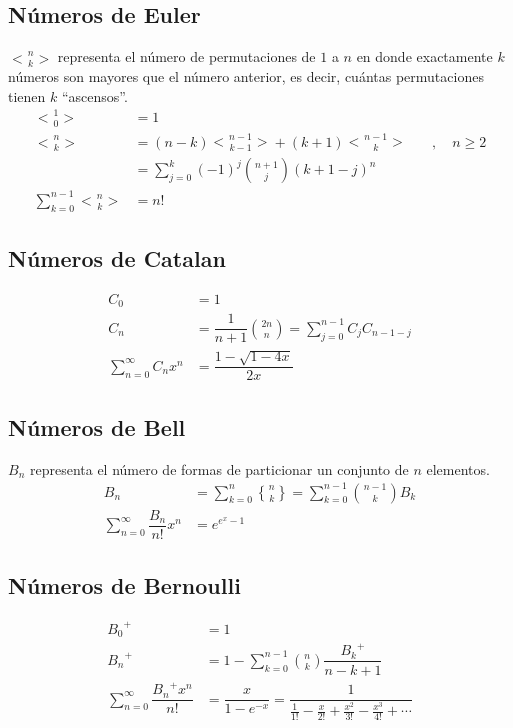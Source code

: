\documentclass[11pt]{article}
\newcommand{\genstirlingII}[3]{%
	\genfrac{\{}{\}}{0pt}{#1}{#2}{#3}%
}
\newcommand{\genEuler}[3]{%
	\genfrac{<}{>}{0pt}{#1}{#2}{#3}%
}
\newcommand{\stirlingII}[2]{\genstirlingII{}{#1}{#2}}
\newcommand{\euler}[2]{\genEuler{}{#1}{#2}}
\begin{document}
		\subsection{Números de Euler}
			$\euler{n}{k}$ representa el número de permutaciones de $1$ a $n$ en donde exactamente $k$ números son mayores que el número anterior, es decir, cuántas permutaciones tienen $k$ ``ascensos''.
			\begin{align*}
				\euler{1}{0} &= 1 \\
				\euler{n}{k} &= (n-k)\euler{n-1}{k-1} + (k+1)\euler{n-1}{k} \quad &, \quad n \geq 2 \\
				&= \sum_{j=0}^{k} (-1)^j \binom{n+1}{j} (k+1-j)^n \\
				\sum_{k=0}^{n-1} \euler{n}{k} &= n!
			\end{align*}
		
		\subsection{Números de Catalan}
			\begin{align*}
				C_0 &= 1 \\
				C_n &= \dfrac{1}{n+1}\binom{2n}{n} = \sum_{j=0}^{n-1} C_j C_{n-1-j} \\
				\sum_{n=0}^{\infty} C_n x^n &= \dfrac{1-\sqrt{1-4x}}{2x}
			\end{align*}
		
		\subsection{Números de Bell}
			$B_n$ representa el número de formas de particionar un conjunto de $n$ elementos.
			\begin{align*}
				B_n &= \sum_{k=0}^{n}\stirlingII{n}{k} = \sum_{k=0}^{n-1}\binom{n-1}{k} B_k \\
				\sum_{n=0}^{\infty} \dfrac{B_n}{n!}x^n &= e^{e^x-1}
			\end{align*}
		
		\subsection{Números de Bernoulli}
			\begin{align*}
				{B_0}^+ &= 1 \\
				{B_n}^+ &= 1 - \sum_{k=0}^{n-1}\binom{n}{k}\dfrac{{B_k}^+}{n-k+1} \\
				\sum_{n=0}^{\infty} \dfrac{{B_n}^+ x^n}{n!} &= \dfrac{x}{1-e^{-x}} = \dfrac{1}{\frac{1}{1!}-\frac{x}{2!}+\frac{x^2}{3!}-\frac{x^3}{4!}+\cdots}
			\end{align*}
		
\end{document}
